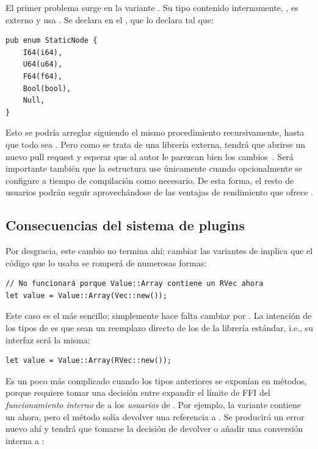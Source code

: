 El primer problema surge en la variante . Su tipo contenido
internamente, , es externo y usa . Se
declara en el \crate {}, que lo declara tal que:

\begin{verbatim}
pub enum StaticNode {
    I64(i64),
    U64(u64),
    F64(f64),
    Bool(bool),
    Null,
}
\end{verbatim}

Esto se podría arreglar siguiendo el mismo procedimiento recursivamente, hasta
que todo sea \rust{#[repr(C)]}. Pero como se trata de una librería externa,
tendrá que abrirse un nuevo pull request y esperar que al autor le parezcan bien
los cambios~\cite{openstaticnode}. Será importante también que la estructura use
\rust{#[repr(C)]} únicamente cuando opcionalmente se configure a tiempo de
compilación como necesario. De esta forma, el resto de usuarios podrán seguir
aprovechándose de las ventajas de rendimiento que ofrece .

\subsection{Consecuencias del sistema de plugins}

Por desgracia, este cambio no termina ahí; cambiar las variantes de 
implica que el código que lo usaba se romperá de numerosas formas:

\begin{verbatim}
// No funcionará porque Value::Array contiene un RVec ahora
let value = Value::Array(Vec::new());
\end{verbatim}

Este caso es el más sencillo: simplemente hace falta cambiar  por
. La intención de los tipos de \abistable es que sean un reemplazo
directo de los de la librería estándar, i.e., su interfaz será la misma:

\begin{verbatim}
let value = Value::Array(RVec::new());
\end{verbatim}

Es un poco más complicado cuando los tipos anteriores se exponían en métodos,
porque requiere tomar una decisión entre expandir el límite de FFI del
\emph{funcionamiento interno} de  a los \emph{usuarios} de
. Por ejemplo, la variante  contiene un
 ahora, pero el método  solía devolver una
referencia a . Se producirá un error nuevo ahí y tendrá que
tomarse la decisión de devolver  o añadir una conversión interna
a :

